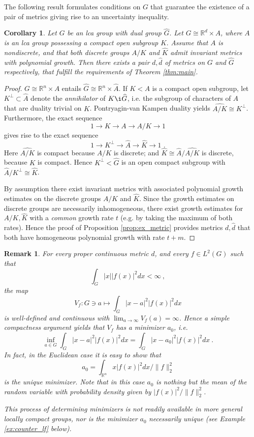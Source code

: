 \documentclass[12pt, reqno]{amsart}
\newtheorem{corollary}[theorem]{Corollary}
\newtheorem{remark}[theorem]{Remark}
\begin{document}
The following result formulates conditions on $G$ that guarantee the existence of a pair of metrics giving rise to an uncertainty inequality. 
\begin{corollary}
Let $G$ be an lca group with dual group $\widehat{G}$. Let $G \cong \mathbb{R}^d \times A$, where $A$ is an lca group possessing a compact open subgroup $K$. Assume that $A$ is nondiscrete, and that both discrete groups $A/K$ and $\widehat{K}$ admit invariant metrics with polynomial growth. Then there exists a pair $d,\widehat{d}$ of metrics on $G$ and $\widehat{G}$ respectively, that fulfill the requirements of Theorem \ref{thm:main}.
\end{corollary}
\begin{proof}
    $G \cong \mathbb{R}^n \times A$ entails $\widehat{G} \cong \mathbb{R}^n \times \widehat{A}$. If $K < A$ is a compact open subgroup, let $K^\bot \subset \widehat{A}$ denote the \textit{annihilator} of $K \i \widehat{G}$, i.e. the subgroup of characters of $A$ that are duality trivial on $K$. Pontryagin-van Kampen duality yields $\widehat{A/K} \cong K^\bot$. Furthermore,  the exact sequence
    \[
    1 \to K \to A \to A/K \to 1 
    \]
    gives rise to the exact sequence
    \[
    1 \to K^\bot \to \widehat{A} \to \widehat{K} \to 1\,\,.
    \] Here $\widehat{A/K}$ is compact because $A/K$ is discrete; and $\widehat{K} \cong \widehat{A}/\widehat{A/K}$ is discrete, because $K$ is compact. Hence $K^\bot < \widehat{G}$ is an open compact subgroup with $\widehat{A}/K^\bot \cong \widehat{K}$. 

    By assumption there exist invariant metrics with associated polynomial growth estimates on the discrete groups $A/K$ and $\widehat{K}$. Since the growth estimates on discrete groups are necessarily inhomogeneous, there exist  growth estimates for $A/K, \widehat{K}$ with a \textit{common} growth rate $t$ (e.g. by taking the maximum of both rates). 
    Hence the proof of Proposition \ref{prop:ex_metric} provides metrics $d, \widehat{d}$ that both have homogeneous polynomial growth with rate $t+m$.
\end{proof}


\begin{remark} \label{rem:minimizer}
    For every proper continuous metric $d$, and every $f \in L^2(G)$ such that
    \[
    \int_G |x| |f(x)|^2 dx < \infty~,
    \] the map 
    \[
    V_f : G \ni a \mapsto \int_G |x-a|^2 |f(x)|^2 dx 
    \] is well-defined and continuous with $\lim_{a \to \infty} V_f(a)= \infty$. Hence a simple compactness argument yields that $V_f$ has a minimizer $a_0$, i.e. 
    \[
    \inf_{a \in G}  \int_G |x-a|^2 |f(x)|^2 dx =  \int_G |x-a_0|^2 |f(x)|^2 dx~.
    \] In fact, in the Euclidean case it is easy to show that 
    \[
    a_0 = \int_{\mathbb{R}^n} x |f(x)|^2 dx/ \| f \|_2^2
    \] is the unique minimizer. Note that in this case $a_0$ is nothing but the mean of the random variable with probability density given by $|f(x)|^2/\| f \|_2^2$.

    This process of determining minimizers is not readily available in more general locally compact groups, nor is the minimizer $a_0$ necessarily unique (see Example \ref{ex:counter_lf} below).  
\end{remark}
\end{document}
